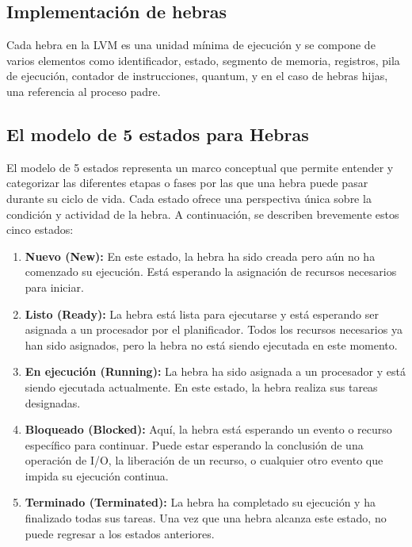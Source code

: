 \subsection{Implementación de hebras}
Cada hebra en la LVM es una unidad mínima de ejecución y se compone de varios elementos como identificador, estado, segmento de memoria, registros, pila de ejecución, contador de instrucciones, quantum, y en el caso de hebras hijas, una referencia al proceso padre.

\subsection{El modelo de 5 estados para Hebras}

El modelo de 5 estados representa un marco conceptual que permite entender y categorizar las diferentes etapas o fases por las que una hebra puede pasar durante su ciclo de vida. Cada estado ofrece una perspectiva única sobre la condición y actividad de la hebra. A continuación, se describen brevemente estos cinco estados:

\begin{enumerate}
    \item \textbf{Nuevo (New):} En este estado, la hebra ha sido creada pero aún no ha comenzado su ejecución. Está esperando la asignación de recursos necesarios para iniciar.

    \item \textbf{Listo (Ready):} La hebra está lista para ejecutarse y está esperando ser asignada a un procesador por el planificador. Todos los recursos necesarios ya han sido asignados, pero la hebra no está siendo ejecutada en este momento.

    \item \textbf{En ejecución (Running):} La hebra ha sido asignada a un procesador y está siendo ejecutada actualmente. En este estado, la hebra realiza sus tareas designadas.

    \item \textbf{Bloqueado (Blocked):} Aquí, la hebra está esperando un evento o recurso específico para continuar. Puede estar esperando la conclusión de una operación de I/O, la liberación de un recurso, o cualquier otro evento que impida su ejecución continua.

    \item \textbf{Terminado (Terminated):} La hebra ha completado su ejecución y ha finalizado todas sus tareas. Una vez que una hebra alcanza este estado, no puede regresar a los estados anteriores.
\end{enumerate}

